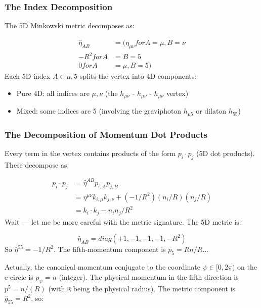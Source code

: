 \documentclass[aps,prd,preprint,superscriptaddress,longbibliography,floatfix]{revtex4-2}
\theoremstyle{remark}
\begin{document}
\subsubsection{The Index Decomposition}

The 5D Minkowski metric decomposes as:


\begin{align}
    \hat{\eta}_{AB} &= (\eta_{\mu\nu}  for A = \mu, B = \nu \\
    -R^{2}     for A &= B = 5 \\
    0       for A &= \mu, B = 5)
\end{align}
Each 5D index $A \in {\mu, 5}$ splits the vertex into 4D components:

\begin{itemize}
  \item Pure 4D: all indices are $\mu, \nu$ (the $h_{\mu\nu}$ - $h_{\mu\nu}$ - $h_{\mu\nu}$ vertex)
  \item Mixed: some indices are 5 (involving the graviphoton $h_{\mu5}$ or dilaton $h_{55}$)
\end{itemize}


\subsubsection{The Decomposition of Momentum Dot Products}

Every term in the vertex contains products of the form $p_i \cdot p_j$ (5D dot products). These decompose as:


\begin{align}
    p_i \cdot p_j &= \hat{\eta}^{AB} p_{i,A} p_{j,B} \\
    & = \eta^{\mu\nu} k_{i,\mu} k_{j,\nu} + (-1/R^{2})(n_i/R)(n_j/R) \\
    & = k_i \cdot k_j - n_i n_j / R^{2}
\end{align}
Wait --- let me be more careful with the metric signature. The 5D metric is:


\begin{equation}
    \hat{\eta}_{AB} = diag(+1, -1, -1, -1, -R^{2})
\end{equation}
So $\hat{\eta}^{55} = -1/R^{2}$. The fifth-momentum component is $p_5 = Rn/R$...

Actually, the canonical momentum conjugate to the coordinate $\psi \in [0, 2\pi)$ on the e-circle is $p_\psi = n$ (integer). The physical momentum in the fifth direction is $p^5 = n/(R)$ (with \texttt{R} being the physical radius). The metric component is $\hat{g}_{55} = R^{2}$, so:
\end{document}
